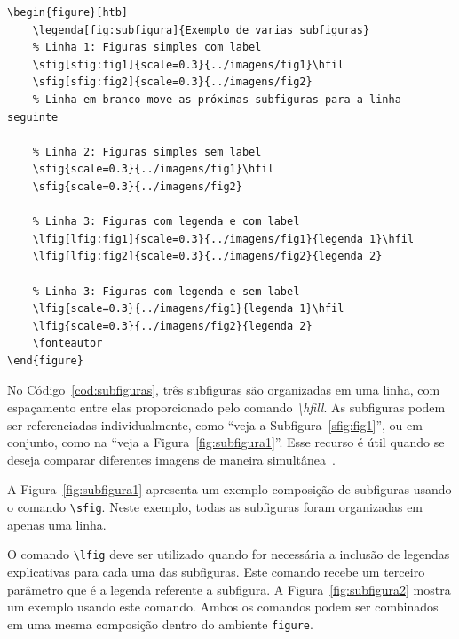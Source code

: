 \documentclass[
    12pt
    ,oneside
    ,a4paper
    ,chapter=TITLE
    ,section=TITLE
    ,sumario=abnt-6027-2012]{abntex2}
\begin{document}
\begin{codigo}[htb]
\begin{lstlisting}
\begin{figure}[htb]
    \legenda[fig:subfigura]{Exemplo de varias subfiguras}
    % Linha 1: Figuras simples com label
    \sfig[sfig:fig1]{scale=0.3}{../imagens/fig1}\hfil
    \sfig[sfig:fig2]{scale=0.3}{../imagens/fig2}
    % Linha em branco move as próximas subfiguras para a linha seguinte

    % Linha 2: Figuras simples sem label
    \sfig{scale=0.3}{../imagens/fig1}\hfil
    \sfig{scale=0.3}{../imagens/fig2}

    % Linha 3: Figuras com legenda e com label
    \lfig[lfig:fig1]{scale=0.3}{../imagens/fig1}{legenda 1}\hfil
    \lfig[lfig:fig2]{scale=0.3}{../imagens/fig2}{legenda 2}

    % Linha 3: Figuras com legenda e sem label
    \lfig{scale=0.3}{../imagens/fig1}{legenda 1}\hfil
    \lfig{scale=0.3}{../imagens/fig2}{legenda 2}
    \fonteautor
\end{figure}
\end{lstlisting}
\fonteautor
\end{codigo}

No Código~\ref{cod:subfiguras}, três subfiguras são organizadas em uma linha, com espaçamento entre elas proporcionado pelo comando \textit{\textbackslash hfill}. As subfiguras podem ser referenciadas individualmente, como ``veja a Subfigura~\ref{sfig:fig1}'', ou em conjunto, como na ``veja a Figura~\ref{fig:subfigura1}''. Esse recurso é útil quando se deseja comparar diferentes imagens de maneira simultânea~\cite{goossens1997latex}.

A Figura~\ref{fig:subfigura1} apresenta um exemplo composição de subfiguras usando o comando \texttt{\textbackslash sfig}. Neste exemplo, todas as subfiguras foram organizadas em apenas uma linha.

\begin{figure}[htb]
    \hfil
    \hfil
    \hfil
\end{figure}

O comando \texttt{\textbackslash lfig} deve ser utilizado quando for necessária a inclusão de legendas explicativas para cada uma das subfiguras. Este comando recebe um terceiro parâmetro que é a legenda referente a subfigura. A Figura~\ref{fig:subfigura2} mostra um exemplo usando este comando. Ambos os comandos podem ser combinados em uma mesma composição dentro do ambiente \texttt{figure}. 
\end{document}
